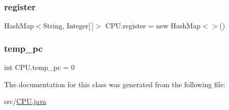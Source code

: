 \subsubsection{\texorpdfstring{register}{register}}
{\footnotesize\ttfamily Hash\+Map$<$String, Integer\mbox{[}$\,$\mbox{]}$>$ C\+P\+U.\+register = new Hash\+Map$<$$>$()\hspace{0.3cm}{\ttfamily [private]}}

\mbox{\label{class_c_p_u_aa0ca73ce7dd3f5f7c8e5ab2afab7f674}} 
\subsubsection{\texorpdfstring{temp\+\_\+pc}{temp\_pc}}
{\footnotesize\ttfamily int C\+P\+U.\+temp\+\_\+pc = 0\hspace{0.3cm}{\ttfamily [private]}}



The documentation for this class was generated from the following file\+:\begin{DoxyCompactItemize}
\item 
src/\mbox{\hyperlink{_c_p_u_8java}{C\+P\+U.\+java}}\end{DoxyCompactItemize}

